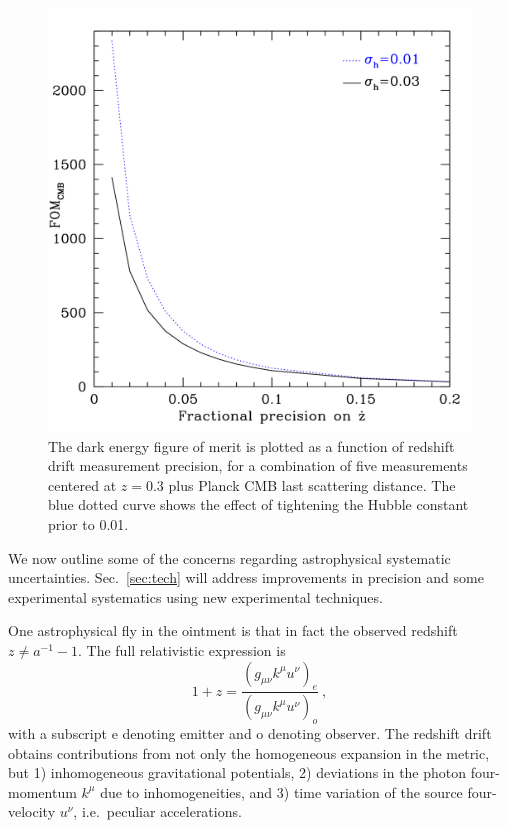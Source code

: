 \documentclass[preprint2, 10pt]{aastex}
\newcommand{\be}{\begin{equation}}
\newcommand{\ee}{\end{equation}}
\begin{document}
\begin{figure}[!htbp] 
   \centering
  \includegraphics[width=\columnwidth]{fomprec.pdf}
\caption{The dark energy figure of merit is plotted as a function of 
redshift drift measurement precision, for a combination of five measurements 
centered at $z=0.3$ plus Planck CMB last scattering distance. The blue 
dotted curve shows the effect of tightening the Hubble constant prior to 
0.01. 
} 
\label{fig:fomprec} 
\end{figure}


We now outline 
some of the 
concerns regarding astrophysical systematic uncertainties. Sec.~\ref{sec:tech} 
will address improvements in precision and some experimental systematics 
using new experimental techniques. 

One astrophysical fly in the ointment is that in fact the observed redshift 
$z\ne a^{-1}-1$. The full relativistic expression is 
\be 
1+z=\frac{(g_{\mu\nu}k^\mu u^\nu)_e}{(g_{\mu\nu}k^\mu u^\nu)_o}\ , 
\label{eq:zgen} 
\ee 
with a subscript e denoting emitter and o denoting observer. 
The redshift drift obtains contributions from not only the 
homogeneous expansion in the metric, but 1) inhomogeneous gravitational 
potentials, 2) deviations in the photon four-momentum $k^\mu$ due to 
inhomogeneities, and 3) time variation of the source four-velocity $u^\nu$, 
i.e.\ peculiar accelerations.  
\end{document}
